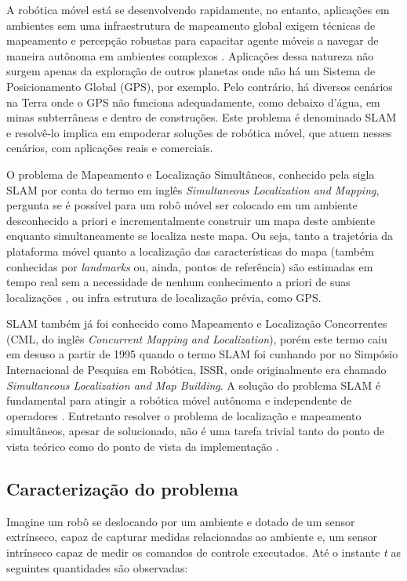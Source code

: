 
A robótica móvel está se desenvolvendo rapidamente, no entanto, aplicações 
em ambientes sem uma infraestrutura de mapeamento global exigem técnicas 
de mapeamento e percepção robustas para capacitar agente móveis a 
navegar de maneira autônoma em ambientes complexos \cite{saeedi2016multiple}. Aplicações dessa 
natureza não surgem apenas da exploração de outros planetas onde não há 
um Sistema de Posicionamento Global (GPS), por exemplo. Pelo contrário, há diversos cenários na Terra onde o 
GPS não funciona adequadamente, como debaixo d'água, 
em minas subterrâneas e dentro de construções. Este problema é denominado SLAM e resolvê-lo implica em empoderar soluções de robótica móvel, 
que atuem nesses cenários, com aplicações reais e comerciais.

O problema de Mapeamento e Localização Simultâneos, conhecido pela sigla SLAM por conta do termo em inglês \textit{Simultaneous Localization and Mapping}, pergunta se é possível para um robô móvel ser colocado em um ambiente desconhecido a priori e incrementalmente construir um mapa deste ambiente enquanto simultaneamente se localiza neste mapa. Ou seja, tanto a trajetória da plataforma móvel quanto a localização das características do mapa (também conhecidas por \textit{landmarks} ou, ainda, pontos de referência) são estimadas em tempo real sem a necessidade de nenhum conhecimento a priori de suas localizações \cite{durrant2006simultaneous}, ou infra estrutura de localização prévia, como GPS.

SLAM também já foi conhecido como Mapeamento e Localização Concorrentes (CML, do inglês \textit{Concurrent Mapping and Localization}), porém este termo caiu em desuso a partir de 1995 quando o termo SLAM foi cunhando por  no Simpósio Internacional de Pesquisa em Robótica, ISSR, onde originalmente era chamado \textit{Simultaneous Localization and Map Building}. A solução do problema SLAM é fundamental para atingir a robótica móvel autônoma e independente de operadores \cite{durrant2006simultaneous}. Entretanto resolver o problema de localização e mapeamento simultâneos, apesar de solucionado, não é uma tarefa trivial tanto do ponto de vista teórico como do ponto de vista da implementação \cite{durrant1996localization}.

\subsection*{Caracterização do problema}
Imagine um robô se deslocando por um ambiente e dotado de um sensor extrínseco, capaz de capturar medidas relacionadas ao 
ambiente e, um sensor intrínseco capaz de medir os comandos de 
controle executados. Até o instante \emph{t} as seguintes 
quantidades são observadas:

